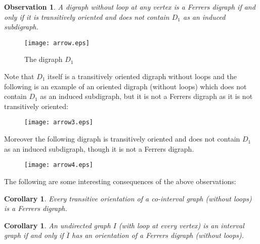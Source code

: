 \documentclass[11pt]{article}
\newtheorem{cor}[thm]{Corollary}
\newtheorem{obs}[thm]{Observation}
\theoremstyle{definition}
\theoremstyle{remark}
\numberwithin{equation}{section}
\begin{document}
\begin{obs}\label{lem:beta}
A digraph without loop at any vertex is a Ferrers digraph if and only if it is transitively oriented and does not contain $D_1$ as an induced subdigraph.
\end{obs}

\begin{figure}[h]
\begin{center}
\texttt{[image: arrow.eps]}
\caption{The digraph $D_1$}\label{fig:d1}
\end{center}
\end{figure}

Note that $D_1$ itself is a transitively oriented digraph without loops  and the following is an example of an oriented digraph (without loops) which does not contain $D_1$ as an induced subdigraph, but it is not a Ferrers digraph as it is not transitively oriented:

\begin{figure}[h]
\begin{center}
\texttt{[image: arrow3.eps]}
\end{center}
\end{figure}

\noindent Moreover the following digraph is transitively oriented and does not contain $D_1$ as an induced subdigraph, though it is not a Ferrers digraph.

\begin{figure}[h]
\begin{center}
\texttt{[image: arrow4.eps]}
\end{center}
\end{figure}

The following are some interesting consequences of the above observations:

\begin{cor}\label{cor:chi}
Every transitive orientation of a co-interval graph (without loops) is a Ferrers digraph.
\end{cor}

\begin{cor}\label{cor:delta}
An undirected graph $I$ (with loop at every vertex) is an interval graph if and only if $\overline{I}$ has an orientation of a Ferrers digraph (without loops). 
\end{cor}
\end{document}
